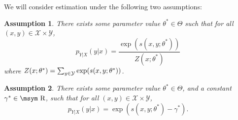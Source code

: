 \documentclass[11pt,a4paper]{article}
\newcommand{\reals}{\mbox{\msym R}}
\newcommand{\str}[3]{s(#1, #2; #3)}
\newtheorem{assumption}{Assumption}[section]
\newcommand{\commentout}[1]{}
\begin{document}
\commentout{
\begin{itemize}

\item We have sets ${\cal X}$ and ${\cal Y}$, where ${\cal X}, {\cal Y}$ are
  finite. 

\item There is some unknown joint distribution $p_{X, Y}(x, y)$ where
  $x \in {\cal X}$ and $y \in {\cal Y}$. We assume that the marginal distributions satisfy $p_X(x) >0$ for all $x \in {\cal X}$ and
  $p_Y(y)> 0$ for all $y\in {\cal Y}$. 

\item We have training examples $\{x^{(i)}, y^{(i)}\}_{i=1}^n$
drawn I.I.D. from $p_{X, Y}(x, y)$.

 \item We have some scoring function $\str{x}{y}{\theta}$ where $\theta$
   are the parameters of the model. For example, $\str{x}{y}{\theta}$ may
   be defined by a neural network. 


\item We use $\Theta$ to refer to the parameter space (set of possible
  values of $\theta$). We assume that $\Theta \subseteq \reals^d$ for some integer $d$.

\item We use $p_N(y)$ to refer to a distribution from which
negative examples are drawn in the NCE approach. We assume that
$p_N(y) > 0$ for all $y\in {\cal Y}$.

\end{itemize}}



We will consider estimation under the following two assumptions:

\begin{assumption}
There exists some parameter value $\theta^* \in \Theta$ such that for all $ (x, y)\in\mathcal{X} \times \mathcal{Y}$, 
\begin{equation}
 p_{Y|X}(y | x) = \frac{\exp ( \str{x}{y}{\theta^*} ) }{Z(x; \theta^*)}
\label{eq:model-ranking}
\end{equation}
where $Z(x; \theta^*) = \sum_{y \in {\cal Y}} \exp ( \str{x}{y}{\theta^*} )
$.
\label{assump:ranking}
\end{assumption}
\begin{assumption}
There exists some parameter value $\theta^* \in \Theta$, and a
constant $\gamma^* \in \reals$, such that for all $ (x, y)\in\mathcal{X} \times \mathcal{Y}$, 
\begin{equation}
  p_{Y|X}(y | x) = \exp \left( \str{x}{y}{\theta^*} - \gamma^* \right).
  \label{eq:model-binary}
\end{equation}
\label{assump:binary}
\end{assumption}
\end{document}

